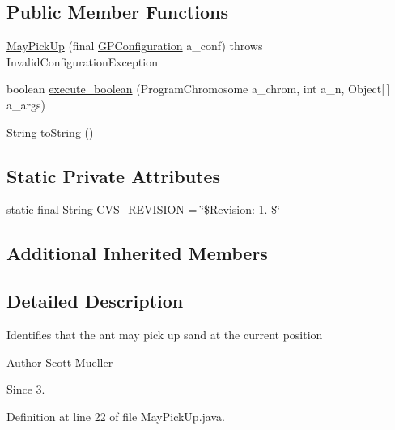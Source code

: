\subsection*{Public Member Functions}
\begin{DoxyCompactItemize}
\item 
\hyperlink{classexamples_1_1gp_1_1painted_desert_1_1_may_pick_up_af2c22cff1f7fc8547ceae9c38073d48b}{May\-Pick\-Up} (final \hyperlink{classorg_1_1jgap_1_1gp_1_1impl_1_1_g_p_configuration}{G\-P\-Configuration} a\-\_\-conf)  throws Invalid\-Configuration\-Exception 
\item 
boolean \hyperlink{classexamples_1_1gp_1_1painted_desert_1_1_may_pick_up_a6d2e194b886a84da27f13404f646a09b}{execute\-\_\-boolean} (Program\-Chromosome a\-\_\-chrom, int a\-\_\-n, Object\mbox{[}$\,$\mbox{]} a\-\_\-args)
\item 
String \hyperlink{classexamples_1_1gp_1_1painted_desert_1_1_may_pick_up_af7d33b36a0c19d66176645881f243d50}{to\-String} ()
\end{DoxyCompactItemize}
\subsection*{Static Private Attributes}
\begin{DoxyCompactItemize}
\item 
static final String \hyperlink{classexamples_1_1gp_1_1painted_desert_1_1_may_pick_up_a6345f3df7c7ce80d8a296b53ea52eedb}{C\-V\-S\-\_\-\-R\-E\-V\-I\-S\-I\-O\-N} = \char`\"{}\$Revision\-: 1. \$\char`\"{}
\end{DoxyCompactItemize}
\subsection*{Additional Inherited Members}


\subsection{Detailed Description}
Identifies that the ant may pick up sand at the current position

\begin{DoxyAuthor}{Author}
Scott Mueller 
\end{DoxyAuthor}
\begin{DoxySince}{Since}
3. 
\end{DoxySince}


Definition at line 22 of file May\-Pick\-Up.\-java.



